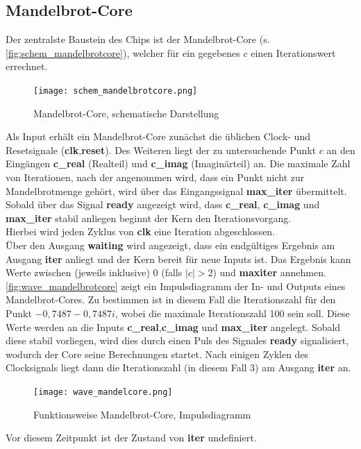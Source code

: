 \documentclass[a4paper,12pt,onesided]{report}
\begin{document}
\subsection{Mandelbrot-Core}
\label{subsec:mandelcore}
Der zentralste Baustein des Chips ist der Mandelbrot-Core (s. \autoref{fig:schem_mandelbrotcore}), welcher für ein gegebenes $c$ einen Iterationswert errechnet.
\begin{figure}[H]
	\centering
	\texttt{[image: schem\_mandelbrotcore.png]}
	\caption{Mandelbrot-Core, schematische Darstellung}
	\label{fig:schem_mandelbrotcore}
\end{figure}
Als Input erhält ein Mandelbrot-Core zunächst die üblichen Clock- und Resetsignale (\textbf{clk},\textbf{reset}).
Des Weiteren liegt der zu untersuchende Punkt $c$ an den Eingängen \textbf{c\_real} (Realteil) und \textbf{c\_imag} (Imaginärteil) an.
Die maximale Zahl von Iterationen, nach der angenommen wird, dass ein Punkt nicht zur Mandelbrotmenge gehört, wird über das Eingangssignal \textbf{max\_iter} übermittelt.\\
Sobald über das Signal \textbf{ready} angezeigt wird, dass \textbf{c\_real}, \textbf{c\_imag} und \textbf{max\_iter} stabil anliegen beginnt der Kern den Iterationsvorgang.\\
Hierbei wird jeden Zyklus von \textbf{clk} eine Iteration abgeschlossen.\\
Über den Ausgang \textbf{waiting} wird angezeigt, dass ein endgültiges Ergebnis am Ausgang \textbf{iter} anliegt und der Kern bereit für neue Inputs ist.
Das Ergebnis kann Werte zwischen (jeweils inklusive) 0 (falls $|c|>2$) und \textbf{maxiter} annehmen.\\
\autoref{fig:wave_mandelbrotcore} zeigt ein Impulsdiagramm der In- und Outputs eines Mandelbrot-Cores.
Zu bestimmen ist in diesem Fall die Iterationszahl für den Punkt $-0,7487-0,7487i$, wobei die maximale Iterationszahl 100 sein soll.
Diese Werte werden an die Inputs \textbf{c\_real},\textbf{c\_imag} und \textbf{max\_iter} angelegt.
Sobald diese stabil vorliegen, wird dies durch einen Puls des Signales \textbf{ready} signalisiert, wodurch der Core seine Berechnungen startet.
Nach einigen Zyklen des Clocksignals liegt dann die Iterationszahl (in diesem Fall 3) am Ausgang \textbf{iter} an.
\begin{figure}[H]
	\centering
	\texttt{[image: wave\_mandelcore.png]}
	\caption{Funktionsweise Mandelbrot-Core, Impulsdiagramm}
	\label{fig:wave_mandelbrotcore}
\end{figure}
Vor diesem Zeitpunkt ist der Zustand von \textbf{iter} undefiniert.
\end{document}

